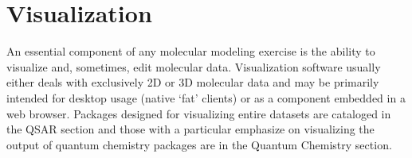 \section{Visualization}
  
An essential component of any molecular modeling exercise is the ability to visualize and, sometimes, edit molecular data.  Visualization software usually either deals with exclusively 2D or 3D molecular data and may be primarily intended for desktop usage (native `fat' clients) or as a component embedded in a web browser.  Packages designed for visualizing entire datasets are cataloged in the QSAR section and those with a particular emphasize on visualizing the output of quantum chemistry packages are in the Quantum Chemistry section.